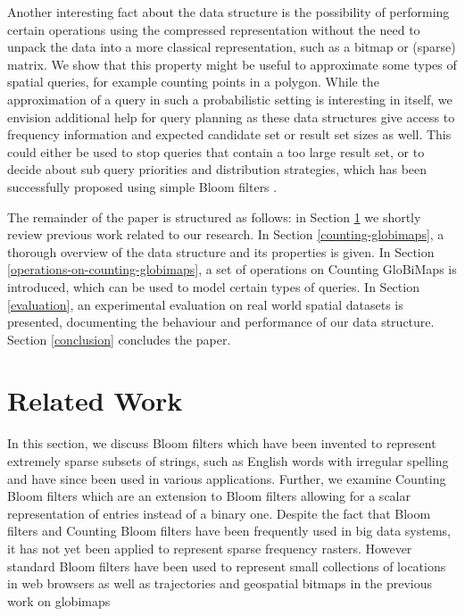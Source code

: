 \documentclass[sigconf]{acmart}
\begin{document}

Another interesting fact about the data structure is the possibility of performing certain operations using the compressed representation without the need to unpack the data into a more classical representation, such as a bitmap or (sparse) matrix. We show that this property might be useful to approximate some types of spatial queries, for example counting points in a polygon. While the approximation of a query in such a probabilistic setting is interesting in itself, we envision additional help for query planning as these data structures give access to frequency information and expected candidate set or result set sizes as well. This could either be used to stop queries that contain a too large result set, or to decide about sub query priorities and distribution strategies, which has been successfully proposed using simple Bloom filters \cite{michael2007improving, lee2012join, papapetrou2010cardinality}.

The remainder of the paper is structured as follows: in Section \ref{related-work} we shortly review previous work related to our research. In Section \ref{counting-globimaps}, a thorough overview of the data structure and its properties is given. In Section \ref{operations-on-counting-globimaps}, a set of operations on Counting GloBiMaps is introduced, which can be used to model certain types of queries. In Section \ref{evaluation}, an experimental evaluation on real world spatial datasets is presented, documenting the behaviour and performance of our data structure. Section \ref{conclusion} concludes the paper.


\section{Related Work}\label{related-work}

In this section, we discuss Bloom filters  which have been invented to represent extremely sparse subsets of strings, such as English words with irregular spelling and have since been used in various applications. Further, we examine Counting Bloom filters which are an extension to Bloom filters allowing for a scalar representation of entries instead of a binary one.
Despite the fact that Bloom filters and Counting  Bloom filters have been frequently used in big data systems, it has not yet been applied to represent sparse frequency rasters. However standard Bloom filters have been used to represent small collections of locations in web browsers \cite{ruppel2014geocookie} as well as trajectories \cite{werner2015bacr} and geospatial bitmaps in the previous work on globimaps \cite{werner2019globimaps}
\end{document}
